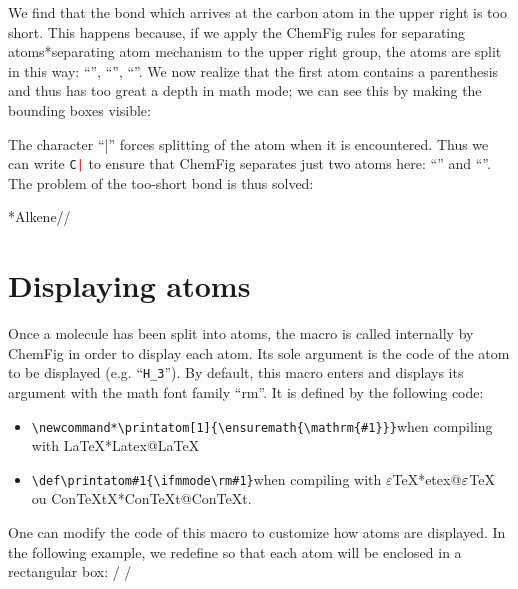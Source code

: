 \documentclass[10pt]{article}
\makeatletter
\newcommand\idx{\@ifstar{\let\print@or@not\@gobble\idx@}{\let\print@or@not\@firstofone\idx@}}
\newcommand\idx@[1]{%
	\ifcat\expandafter\noexpand\@car#1\@nil\relax%
		\expandafter\ifx\@car#1\@nil\protect
			\index{#1}%
			\print@or@not{#1}%
		\else
			\saveexpandmode\expandarg
			\StrSubstitute{\string#1}{\string @}{\@empty\protect\symbol{'100}}[\temp@]%
			\StrGobbleLeft\temp@1[\temp@]%
			\restoreexpandmode
			\expandafter\index\expandafter{\temp@ @\protect\texttt{\protect\textbackslash\temp@}}%
			\print@or@not{\texttt{\string#1}}%
		\fi
	\else
		\index{#1}%
		\print@or@not{#1}%
	\fi
}
\newcommand\make@car@active[2]{%
	\catcode`#1\active
	\begingroup
		\lccode`\~`#1\relax
		\lowercase{\endgroup\def~{#2}}%
}
\newif\if@exstar
\newcommand\exemple{%
	\begingroup
	\parskip\z@
	\@makeother\;\@makeother\!\@makeother\?\@makeother\:%
	\@ifstar{\@exstartrue\exemple@}{\@exstarfalse\exemple@}}
\newcommand\exemple@[2][65]{%
	\medbreak\noindent
	\begingroup
		\let\do\@makeother\dospecials
		\make@car@active\ { {}}%
		\make@car@active\^^M{\par\leavevmode}%
		\make@car@active\,{\leavevmode\kern\z@\string,}%
		\make@car@active\-{\leavevmode\kern\z@\string-}%
		\make@car@active\>{\leavevmode\kern\z@\string>}%
		\make@car@active\<{\leavevmode\kern\z@\string<}%
		\exemple@@{#1}{#2}%
}
\newcommand\exemple@@[3]{%
	\def\@tempa##1#3{\exemple@@@{#1}{#2}{##1}}%
	\@tempa
}
\newcommand\exemple@@@[3]{%
	\xdef\the@code{#3}%
	\endgroup
	\if@exstar
		\begingroup
			\fboxrule0.4pt
			\let\breakboxparindent\z@
			\def\bkvz@bottom{\hrule\@height\fboxrule}%
			\let\bkvz@before@breakbox\relax
			\def\bkvz@set@linewidth{\advance\linewidth\dimexpr-2\fboxrule-2\fboxsep}%
			\def\bkvz@left{\vrule\@width\fboxrule\hskip\fboxsep}%
			\def\bkvz@right{\hskip\fboxsep\vrule\@width\fboxrule}%
			\def\bkvz@top{\hbox to \hsize{%
				\vrule\@width\fboxrule\@height\fboxrule
				\leaders\bkvz@bottom\hfill
				\ECFAugie
				\fboxsep\z@
				\colorbox{black}{\kern0.25em\color{white}\footnotesize\lower0.5ex\hbox{\strut#2}\kern0.25em}%
				\leaders\bkvz@bottom\hfill
				\vrule\@width\fboxrule\@height\fboxrule}}%
			\breakbox
				\kern.5ex\relax
				\ttfamily\footnotesize\the@code\par
				\normalfont
				\kern3pt
				\hrule height0.1pt width\linewidth depth0.1pt
				\vskip5pt
				\rightskip0pt plus 1fill
				\everypar{{\color{lightgray}\rlap{\vrule height0.1pt width\linewidth depth0.1pt}}\hskip0pt plus 1fill}%
				\newlinechar`\^^M\everyeof{\noexpand}\scantokens{#3}\par
			\endbreakbox
		\endgroup
	\else
		\vskip0.5ex
		\boxput*(0,1)
			{\fboxsep\z@
			\hbox{\ECFAugie\colorbox{black}{\leavevmode\kern0.25em{\color{white}\footnotesize\strut#2}\kern0.25em}}%
			}%
			{\fboxsep5pt
			\fbox{%
				$\vcenter{\hsize\dimexpr0.#1\linewidth-\fboxsep-\fboxrule\relax
					\kern5pt\parskip0pt \ttfamily\footnotesize\the@code}%
				\vcenter{\kern5pt\hsize\dimexpr\linewidth-0.#1\linewidth-\fboxsep-\fboxrule\relax
					\everypar{{\color{lightgray}\rlap{\vrule height0.1pt width\dimexpr\linewidth-0.#1\linewidth-\fboxsep-\fboxrule depth0.1pt}}}%
					\footnotesize\newlinechar`\^^M\everyeof{\noexpand}\scantokens{#3}}$%
				}%
			}%
	\fi
	\medbreak
	\endgroup
}
\let\do\@makeother\dospecials
\newcommand\CF{{\ECFAugie ChemFig}\xspace}
\makeatother
\begin{document}
We find that the bond which arrives at the carbon atom in the upper right is too short. This happens because, if we apply the \CF rules for separating atoms\idx*{separating atom mechanism} to the upper right group, the atoms are split in this way: ``\texttt{}'', ``\texttt{}'', ``\texttt{}''. We now realize that the first atom contains a parenthesis and thus has too great a depth in math mode; we can see this by making the bounding boxes visible:
\begin{center}
\fboxsep=0pt
\renewcommand*\printatom[1]{\fbox{\ensuremath{\mathrm{#1}}}}%
%
\end{center}
The character ``|'' forces splitting of the atom when it is encountered. Thus we can write \texttt{C\textcolor{red}{|}} to ensure that \CF separates just two atoms here: ``\texttt{}'' and ``\texttt{}''. The problem of the too-short bond is thus solved:

\exemple*{Alkene}//

\section{Displaying atoms}\label{perso.affichage}
Once a molecule has been split into atoms, the macro \idx{\printatom} is called internally by \CF in order to display each atom. Its sole argument is the code of the atom to be displayed (e.g. ``\verb-H_3-''). By default, this macro enters \idx{math mode} and displays its argument with the math font family ``rm''. It is defined by the following code:
\begin{itemize}
	\item \verb|\newcommand*\printatom[1]{\ensuremath{\mathrm{#1}}}|\qquad when compiling with \LaTeX{}\idx*{Latex@\protect\LaTeX}
	\item \verb|\def\printatom#1{\ifmmode\rm#1\else$\rm#1$\fi}|\qquad when compiling with $\varepsilon$\TeX{}\idx*{etex@$\protect\varepsilon$\protect\TeX} ou Con\TeX tX\idx*{ConTeXt@Con\protect\TeX{}t}.
\end{itemize}

One can modify the code of this macro to customize how atoms are displayed. In the following example, we redefine \idx{\printatom} so that each atom will be enclosed in a rectangular box:
\exemple{Redefinition of \string\printatom}/\fboxsep=1pt
\renewcommand*\printatom[1]{\fbox{\ensuremath{\mathrm{#1}}}}
/
\end{document}
